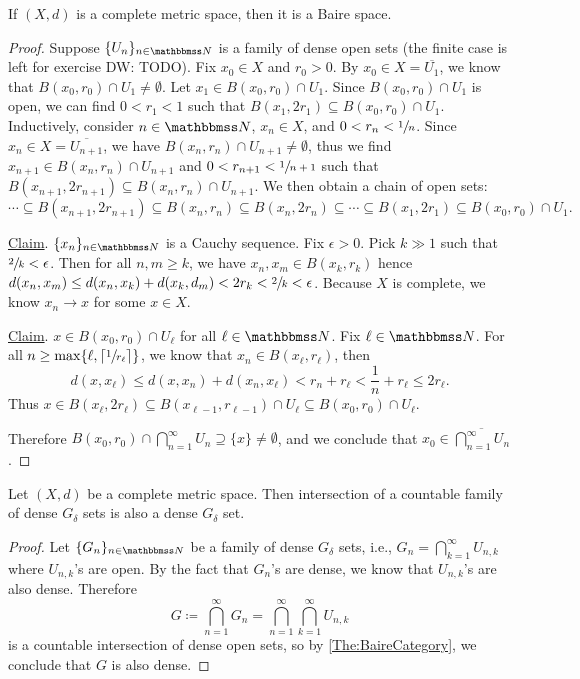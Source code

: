 \documentclass[screen,single]{techreport}
\numberwithin{equation}{section}
\newcommand{\diw}[1]{{\color{Red} DW: #1}}
\begin{document}
\begin{theorem}\label{The:BaireCategory}
  If $(X,d)$ is a complete metric space, then it is a Baire space.
\end{theorem}
\begin{proof}
  Suppose $\{U_n\}_{n \in \bbN}$ is a family of dense open sets (the finite case is left for exercise \diw{TODO}).
  Fix $x_0 \in X$ and $r_0 > 0$.
  By $x_0 \in X = \overline{U_1}$, we know that $B(x_0,r_0) \cap U_1 \neq \emptyset$.
  Let $x_1 \in B(x_0,r_0) \cap U_1$.
  Since $B(x_0,r_0) \cap U_1$ is open, we can find $0 < r_1 < 1$ such that $B(x_1,2r_1) \subseteq B(x_0,r_0) \cap U_1$.
  Inductively, consider $n \in \bbN$, $x_n \in X$, and $0 < r_n < \sfrac{1}{n}$.
  Since $x_n \in X = \overline{U_{n+1}}$, we have $B(x_n,r_n) \cap U_{n+1} \neq \emptyset$, thus we find $x_{n+1} \in B(x_n,r_n) \cap U_{n+1}$ and $0 < r_{n+1} < \sfrac{1}{n+1}$ such that $B(x_{n+1},2r_{n+1}) \subseteq B(x_n,r_n) \cap U_{n+1}$.
  We then obtain a chain of open sets:
  \[
  \cdots \subseteq B(x_{n+1},2r_{n+1}) \subseteq B(x_n,r_n) \subseteq B(x_n,2r_n) \subseteq \cdots \subseteq B(x_1,2r_1) \subseteq B(x_0,r_0) \cap U_1.
  \]
  
  \underline{Claim}. $\{x_n\}_{n \in \bbN}$ is a Cauchy sequence.
  Fix $\epsilon > 0$. Pick $k \gg 1$ such that $\sfrac{2}{k} < \epsilon$.
  Then for all $n,m \ge k$, we have $x_n,x_m \in B(x_k,r_k)$ hence $d(x_n,x_m) \le d(x_n,x_k)+d(x_k,d_m) < 2r_k < \sfrac{2}{k} < \epsilon$.
  Because $X$ is complete, we know $x_n \rightarrow x$ for some $x \in X$.
  
  \underline{Claim}. $x \in B(x_0,r_0) \cap U_\ell$ for all $\ell \in \bbN$.
  Fix $\ell \in \bbN$.
  For all $n \ge \max\{ \ell, \lceil{\sfrac{1}{r_\ell}}\rceil\}$, we know that $x_n \in B(x_\ell,r_\ell)$, then
  \[
  d(x,x_\ell) \le d(x,x_n)+d(x_n,x_\ell) < r_n + r_\ell < \frac{1}{n}+r_\ell \le 2r_\ell.
  \]
  Thus $x \in B(x_\ell,2r_\ell) \subseteq B(x_{\ell-1},r_{\ell-1}) \cap U_\ell \subseteq B(x_0,r_0) \cap U_\ell$.
  
  Therefore $ B(x_0,r_0) \cap \bigcap_{n=1}^\infty U_n \supseteq \{x\} \neq \emptyset$, and we conclude that $x_0 \in \overline{\bigcap_{n=1}^\infty U_n}$. 
\end{proof}

\begin{corollary}\label{Cor:CompleteMetricIntersectDenseGDeltaIsDenseGDelta}
  Let $(X,d)$ be a complete metric space.
  Then intersection of a countable family of dense $G_\delta$ sets is also a dense $G_\delta$ set.
\end{corollary}
\begin{proof}
  Let $\{G_n\}_{n \in \bbN}$ be a family of dense $G_\delta$ sets, i.e., $G_n = \bigcap_{k=1}^\infty U_{n,k}$ where $U_{n,k}$'s are open.
  By the fact that $G_n$'s are dense, we know that $U_{n,k}$'s are also dense.
  Therefore
  \[
  G \coloneqq \bigcap_{n=1}^\infty G_n = \bigcap_{n=1}^\infty \bigcap_{k=1}^\infty U_{n,k}
  \]
  is a countable intersection of dense open sets,
  so by \cref{The:BaireCategory}, we conclude that $G$ is also dense.
\end{proof}
\end{document}
